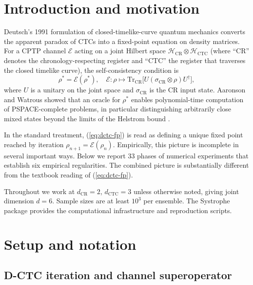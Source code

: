 \documentclass[11pt,a4paper]{article}
\begin{document}
\tableofcontents

\section{Introduction and motivation}

Deutsch's 1991 formulation of closed-timelike-curve quantum
mechanics \cite{Deutsch1991} converts the apparent paradox of CTCs
into a fixed-point equation on density matrices. For a CPTP channel
$\mathcal{E}$ acting on a joint Hilbert space
$\mathcal{H}_{\text{CR}} \otimes \mathcal{H}_{\text{CTC}}$ (where
``CR'' denotes the chronology-respecting register and ``CTC'' the
register that traverses the closed timelike curve), the
self-consistency condition is
\begin{equation}
\rho^* = \mathcal{E}(\rho^*), \quad
\mathcal{E}: \rho \mapsto \mathrm{Tr}_{\text{CR}}\!\big[ U(\sigma_{\text{CR}} \otimes \rho) U^\dagger \big],
\label{eq:dctc-fp}
\end{equation}
where $U$ is a unitary on the joint space and $\sigma_{\text{CR}}$ is
the CR input state. Aaronson and Watrous \cite{AaronsonWatrous2009}
showed that an oracle for $\rho^*$ enables polynomial-time
computation of PSPACE-complete problems, in particular distinguishing
arbitrarily close mixed states beyond the limits of the Helstrom
bound \cite{Helstrom1976}.

In the standard treatment, (\ref{eq:dctc-fp}) is read as defining a
unique fixed point reached by iteration $\rho_{n+1} = \mathcal{E}(\rho_n)$.
Empirically, this picture is incomplete in several important ways.
Below we report 33 phases of numerical experiments that establish
six empirical regularities. The combined picture is substantially
different from the textbook reading of (\ref{eq:dctc-fp}).

Throughout we work at $d_{\text{CR}} = 2$, $d_{\text{CTC}} = 3$
unless otherwise noted, giving joint dimension $d = 6$. Sample sizes
are at least $10^3$ per ensemble. The Systrophe package
\cite{Knopp2026Systrophe} provides the computational infrastructure
and reproduction scripts.

\section{Setup and notation}

\subsection{D-CTC iteration and channel superoperator}
\end{document}
